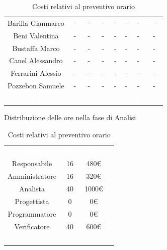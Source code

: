 \begin{table}[h!]
\begin{minipage}[c]{0.53\textwidth}
\begin{tabular}{>{\raggedright\arraybackslash}c|cccccc|c}
		\rowcolor[RGB]{216, 235, 171}
	    	Barilla Gianmarco & - & - & - & - & - & -& -		\\[4pt]
	    \rowcolor[RGB]{233, 245, 206}
	    	Beni Valentina & - & - & - & - & - & -& -			\\[4pt]
	    \rowcolor[RGB]{216, 235, 171}
	    	Bustaffa Marco & - & - & - & - & - & -& -			\\[4pt]
        \rowcolor[RGB]{233, 245, 206}
	    	Canel Alessandro & - & - & - & - & - & -& -			\\[4pt]
        \rowcolor[RGB]{216, 235, 171}
	    	Ferrarini Alessio & - & - & - & - & - & -& -		\\[4pt]
        \rowcolor[RGB]{233, 245, 206}
	    	Pozzebon Samuele & - & - & - & - & - & -& -			\\[4pt]
		\rowcolor[RGB]{47, 106, 73}
			\textcolor{white}{Totale Ruolo} & \textcolor{white}{16} & \textcolor{white}{16} & \textcolor{white}{40} 
			& \textcolor{white}{0} & \textcolor{white}{0} & \textcolor{white}{40}
			& \textcolor{white}{112} \\[4pt]	
    \end{tabular}
    \caption{Distribuzione delle ore nella fase di Analisi}
\end{minipage}
\hfill
\begin{minipage}{0.33\textwidth}
	\centering
	\begin{tabular}{cccc}
	    \rowcolor[RGB]{33, 73, 50}
	    \textcolor{white}{\textbf{Ruolo}} & \textcolor{white}{\textbf{Ore}} & \textcolor{white}{\textbf{Costo}}\\[4pt]
	    \rowcolor[RGB]{216, 235, 171}
	    Responsabile & 16 & 480\euro\\[4pt]
	    \rowcolor[RGB]{233, 245, 206}
	    Amministratore & 16 & 320\euro\\[4pt]
        \rowcolor[RGB]{216, 235, 171}
	    Analista & 40 & 1000\euro\\[4pt]
	    \rowcolor[RGB]{233, 245, 206}
	    Progettista & 0 & 0\euro\\[4pt]
        \rowcolor[RGB]{216, 235, 171}
	    Programmatore & 0 & 0\euro\\[4pt]
	    \rowcolor[RGB]{233, 245, 206}
	    Verificatore & 40 & 600\euro\\[4pt]
		\rowcolor[RGB]{47, 106, 73}
			\textcolor{white}{Totale} & \textcolor{white}{112} & \textcolor{white}{2400\euro}\\[4pt]	
    \end{tabular}	
	\caption{Costi relativi al preventivo orario}

\end{minipage}
\end{table}

